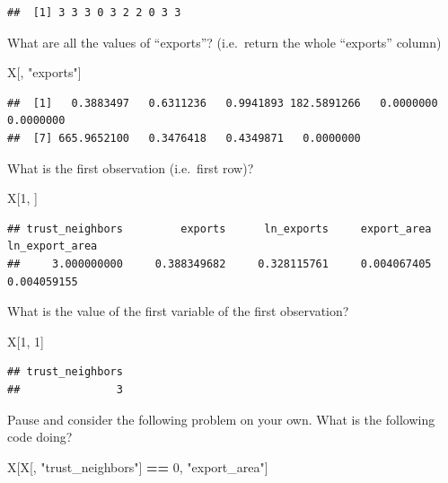 \documentclass[
]{book}
\newenvironment{Shaded}{\begin{snugshade}}{\end{snugshade}}
\newcommand{\DecValTok}[1]{\textcolor[rgb]{0.00,0.00,0.81}{#1}}
\newcommand{\NormalTok}[1]{#1}
\newcommand{\OperatorTok}[1]{\textcolor[rgb]{0.81,0.36,0.00}{\textbf{#1}}}
\newcommand{\StringTok}[1]{\textcolor[rgb]{0.31,0.60,0.02}{#1}}
\theoremstyle{definition}
\theoremstyle{definition}
\theoremstyle{definition}
\theoremstyle{definition}
\theoremstyle{remark}
\begin{document}
\begin{verbatim}
##  [1] 3 3 3 0 3 2 2 0 3 3
\end{verbatim}

What are all the values of ``exports''? (i.e.~return the whole ``exports'' column)

\begin{Shaded}
\begin{Highlighting}[]
\NormalTok{X[, }\StringTok{"exports"}\NormalTok{]}
\end{Highlighting}
\end{Shaded}

\begin{verbatim}
##  [1]   0.3883497   0.6311236   0.9941893 182.5891266   0.0000000   0.0000000
##  [7] 665.9652100   0.3476418   0.4349871   0.0000000
\end{verbatim}

What is the first observation (i.e.~first row)?

\begin{Shaded}
\begin{Highlighting}[]
\NormalTok{X[}\DecValTok{1}\NormalTok{, ]}
\end{Highlighting}
\end{Shaded}

\begin{verbatim}
## trust_neighbors         exports      ln_exports     export_area  ln_export_area 
##     3.000000000     0.388349682     0.328115761     0.004067405     0.004059155
\end{verbatim}

What is the value of the first variable of the first observation?

\begin{Shaded}
\begin{Highlighting}[]
\NormalTok{X[}\DecValTok{1}\NormalTok{, }\DecValTok{1}\NormalTok{]}
\end{Highlighting}
\end{Shaded}

\begin{verbatim}
## trust_neighbors 
##               3
\end{verbatim}

Pause and consider the following problem on your own. What is the following code doing?

\begin{Shaded}
\begin{Highlighting}[]
\NormalTok{X[X[, }\StringTok{"trust_neighbors"}\NormalTok{] }\OperatorTok{==}\StringTok{ }\DecValTok{0}\NormalTok{, }\StringTok{"export_area"}\NormalTok{]}
\end{Highlighting}
\end{Shaded}
\end{document}
